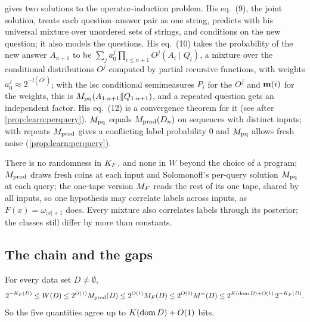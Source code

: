\begin{remark}\label{rem:versions:operator}
\citet[\S4]{solomonoff2008three} gives two solutions to the operator-induction problem. His eq.~(9), the joint solution, treats each question--answer pair as one string, predicts with his universal mixture over unordered sets of strings, and conditions on the new question; it also models the questions. His eq.~(10) takes the probability of the new answer $A_{n+1}$ to be $\sum_ja^j_0\prod_{i\le n+1}O^j(A_i\mid Q_i)$, a mixture over the conditional distributions $O^j$ computed by partial recursive functions, with weights $a^j_0\approx2^{-l(O^j)}$; with the lsc conditional semimeasures $P_i$ for the $O^j$ and $\mathbf{m}(i)$ for the weights, this is $M_{\mathrm{pq}}(A_{1:n+1}\Vert Q_{1:n+1})$, and a repeated question gets an independent factor. His eq.~(12) is a convergence theorem for it (see after \cref{prop:learn:perquery}). $M_{\mathrm{pq}}$ equals $M_{\mathrm{prod}}(D_n)$ on sequences with distinct inputs; with repeats $M_{\mathrm{prod}}$ gives a conflicting label probability $0$ and $M_{\mathrm{pq}}$ allows fresh noise (\cref{prop:learn:perquery}).
\end{remark}

\begin{remark}\label{rem:versions:randomness}
There is no randomness in $K_{F}$, and none in $W$ beyond the choice of a program; $M_{\mathrm{prod}}$ draws fresh coins at each input and Solomonoff's per-query solution $M_{\mathrm{pq}}$ at each query; the one-tape version $M_{F}$ reads the rest of its one tape, shared by all inputs, so one hypothesis may correlate labels across inputs, as $F(x)=\omega_{|x|+1}$ does. Every mixture also correlates labels through its posterior; the classes still differ by more than constants.
\end{remark}

\subsection{The chain and the gaps}\label{sec:versions:chain}

\begin{theorem}\label{thm:versions:chain}
For every data set $D\ne\emptyset$,
\[
2^{-K_{F}(D)}\le W(D)\le2^{O(1)}M_{\mathrm{prod}}(D)\le2^{O(1)}M_{F}(D)\le2^{O(1)}M^{w}(D)\le2^{K(\operatorname{dom} D)+O(1)}\,2^{-K_{F}(D)}.
\]
So the five quantities agree up to $K(\operatorname{dom} D)+O(1)$ bits.
\end{theorem}

